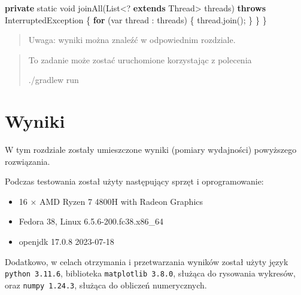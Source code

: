 \documentclass[11pt]{article}
\providecommand{\tightlist}{%
      \setlength{\itemsep}{0pt}\setlength{\parskip}{0pt}}
\newenvironment{Shaded}{}{}
\newcommand{\KeywordTok}[1]{\textcolor[rgb]{0.00,0.44,0.13}{\textbf{{#1}}}}
\newcommand{\DataTypeTok}[1]{\textcolor[rgb]{0.56,0.13,0.00}{{#1}}}
\newcommand{\FunctionTok}[1]{\textcolor[rgb]{0.02,0.16,0.49}{{#1}}}
\newcommand{\NormalTok}[1]{{#1}}
\newcommand{\ControlFlowTok}[1]{\textcolor[rgb]{0.00,0.44,0.13}{\textbf{{#1}}}}
\newcommand{\OperatorTok}[1]{\textcolor[rgb]{0.40,0.40,0.40}{{#1}}}
\newcommand{\BuiltInTok}[1]{{#1}}
\newcommand{\ExtensionTok}[1]{{#1}}
\begin{document}
\begin{Shaded}
\begin{Highlighting}[]
    \KeywordTok{private} \DataTypeTok{static} \DataTypeTok{void} \FunctionTok{joinAll}\OperatorTok{(}\BuiltInTok{List}\OperatorTok{\textless{}?} \KeywordTok{extends} \BuiltInTok{Thread}\OperatorTok{\textgreater{}}\NormalTok{ threads}\OperatorTok{)} \KeywordTok{throws} \BuiltInTok{InterruptedException} \OperatorTok{\{}
        \ControlFlowTok{for} \OperatorTok{(}\DataTypeTok{var}\NormalTok{ thread }\OperatorTok{:}\NormalTok{ threads}\OperatorTok{)} \OperatorTok{\{}
\NormalTok{            thread}\OperatorTok{.}\FunctionTok{join}\OperatorTok{();}
        \OperatorTok{\}}
    \OperatorTok{\}}
\OperatorTok{\}}
\end{Highlighting}
\end{Shaded}

\begin{quote}
Uwaga: wyniki można znaleźć w odpowiednim rozdziale.
\end{quote}

\begin{quote}
To zadanie może zostać uruchomione korzystając z polecenia

\begin{Shaded}
\begin{Highlighting}[]
\ExtensionTok{./gradlew}\NormalTok{ run}
\end{Highlighting}
\end{Shaded}
\end{quote}

    \hypertarget{wyniki}{%
\section{Wyniki}\label{wyniki}}

W tym rozdziale zostały umieszczone wyniki (pomiary wydajności)
powyższego rozwiązania.

Podczas testowania został użyty następujący sprzęt i oprogramowanie:

\begin{itemize}
\tightlist
\item
  16 × AMD Ryzen 7 4800H with Radeon Graphics
\item
  Fedora 38, Linux 6.5.6-200.fc38.x86\_64
\item
  openjdk 17.0.8 2023-07-18
\end{itemize}

Dodatkowo, w celach otrzymania i przetwarzania wyników został użyty
język \texttt{python\ 3.11.6}, biblioteka \texttt{matplotlib\ 3.8.0},
służąca do rysowania wykresów, oraz \texttt{numpy\ 1.24.3}, służąca do
obliczeń numerycznych.
\end{document}
